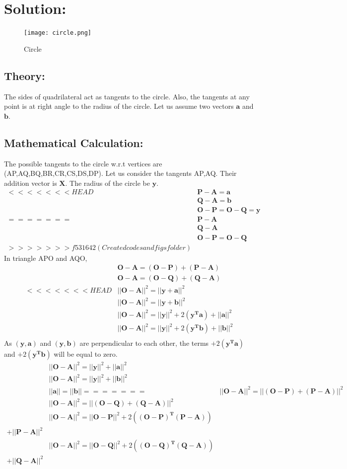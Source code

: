 \documentclass[a4paper,12pt,twocolumn]{article}
\let\vec\mathbf
\begin{document}
\section{Solution:}
\begin{figure}[h]
	\texttt{[image: circle.png]}
	\caption{Circle}
\end{figure}
\subsection{Theory:}
The sides of quadrilateral act as tangents to the circle. Also, the tangents at any point is at right angle to the radius of the circle. Let us assume two vectors $\vec{a}$ and $\vec{b}$.
\subsection{Mathematical Calculation:}
The possible tangents to the circle w.r.t vertices are (AP,AQ,BQ,BR,CR,CS,DS,DP). Let us consider the tangents AP,AQ. Their addition vector is $\vec{X}$. The radius of the circle be $\vec{y}$.
\begin{align*}
<<<<<<< HEAD
&\vec{P-A} = \vec{a}\\
&\vec{Q-A} = \vec{b}\\
	&\vec{O-P} = \vec{O-Q} = \vec{y}\\
=======
&\vec{P-A}\\
&\vec{Q-A}\\
	&\vec{O-P} = \vec{O-Q}\\
>>>>>>> f531642 (Created codes and figs folder)
\end{align*}
In triangle APO and AQO,  
\begin{align*}
	&\vec{O-A}= \vec{(O-P)+(P-A)}\\
	&\vec{O-A}= \vec{(O-Q)+(Q-A)}\\
<<<<<<< HEAD
&||\vec{O-A}||^2 = ||\vec{y+a}||^2\\
	&||\vec{O-A}||^2 = ||\vec{y+b}||^2\\
	&||\vec{O-A}||^2 = ||\vec{y}||^2 +2(\vec{y^Ta}) +||\vec{a}||^2\\
&||\vec{O-A}||^2 = ||\vec{y}||^2 +2(\vec{y^Tb}) +||\vec{b}||^2\\
\end{align*}
As $\vec{(y,a)}$ and $\vec{(y,b)}$ are perpendicular to each other, the terms $+2(\vec{y^Ta})$ and $+2(\vec{y^Tb})$ will be equal to zero. 
\begin{align*}
&||\vec{O-A}||^2 = ||\vec{y}||^2 + ||\vec{a}||^2 \\
&||\vec{O-A}||^2 = ||\vec{y}||^2 + ||\vec{b}||^2\\
&||\vec{a}|| = ||\vec{b}||
=======
	&||\vec{O-A}||^2 = ||\vec{(O-P)+(P-A)}||^2\\
	&||\vec{O-A}||^2 = ||\vec{(O-Q)+(Q-A)}||^2\\
	&||\vec{O-A}||^2 = ||\vec{O-P}||^2 +2(\vec{(O-P)^T(P-A)})\\ +||\vec{P-A}||^2\\
	&||\vec{O-A}||^2 = ||\vec{O-Q}||^2 +2(\vec{(O-Q)^T(Q-A)})\\ +||\vec{Q-A}||^2\\
\end{align*}
\end{document}
